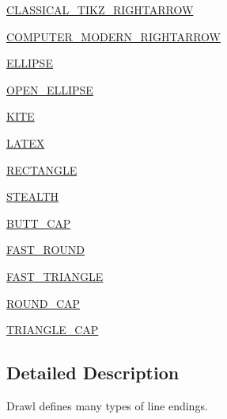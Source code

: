 \begin{DoxyCompactItemize}
\item 
\hyperlink{enumcom_1_1aarrelaakso_1_1drawl_1_1_line_ending_1_1_type_a2ad7fc532e223e6160cc8ac18aea591c}{C\+L\+A\+S\+S\+I\+C\+A\+L\+\_\+\+T\+I\+K\+Z\+\_\+\+R\+I\+G\+H\+T\+A\+R\+R\+OW}
\item 
\hyperlink{enumcom_1_1aarrelaakso_1_1drawl_1_1_line_ending_1_1_type_ad62a65c0f5a67f55d55bb27e5b4d6d10}{C\+O\+M\+P\+U\+T\+E\+R\+\_\+\+M\+O\+D\+E\+R\+N\+\_\+\+R\+I\+G\+H\+T\+A\+R\+R\+OW}
\item 
\hyperlink{enumcom_1_1aarrelaakso_1_1drawl_1_1_line_ending_1_1_type_a8e62fdb30e281b4d639d729ce0134a0d}{E\+L\+L\+I\+P\+SE}
\item 
\hyperlink{enumcom_1_1aarrelaakso_1_1drawl_1_1_line_ending_1_1_type_ac2a4c476b50f85245602abdbfe1bf8a7}{O\+P\+E\+N\+\_\+\+E\+L\+L\+I\+P\+SE}
\item 
\hyperlink{enumcom_1_1aarrelaakso_1_1drawl_1_1_line_ending_1_1_type_a8154683c83e45ef8147726f2f3845fc8}{K\+I\+TE}
\item 
\hyperlink{enumcom_1_1aarrelaakso_1_1drawl_1_1_line_ending_1_1_type_a58c18082a756b4d126cd08a01ede6bef}{L\+A\+T\+EX}
\item 
\hyperlink{enumcom_1_1aarrelaakso_1_1drawl_1_1_line_ending_1_1_type_a6428f3ac47109c9dbe046dddda0e25b3}{R\+E\+C\+T\+A\+N\+G\+LE}
\item 
\hyperlink{enumcom_1_1aarrelaakso_1_1drawl_1_1_line_ending_1_1_type_a36723b935663bf0b801d6e525d0625a9}{S\+T\+E\+A\+L\+TH}
\item 
\hyperlink{enumcom_1_1aarrelaakso_1_1drawl_1_1_line_ending_1_1_type_a48e7e5ca4218f75225d453077cc5fb96}{B\+U\+T\+T\+\_\+\+C\+AP}
\item 
\hyperlink{enumcom_1_1aarrelaakso_1_1drawl_1_1_line_ending_1_1_type_a8666b75fa6d9cbd89c55c1931002d01e}{F\+A\+S\+T\+\_\+\+R\+O\+U\+ND}
\item 
\hyperlink{enumcom_1_1aarrelaakso_1_1drawl_1_1_line_ending_1_1_type_a280550505a48050e5b05282b51460e25}{F\+A\+S\+T\+\_\+\+T\+R\+I\+A\+N\+G\+LE}
\item 
\hyperlink{enumcom_1_1aarrelaakso_1_1drawl_1_1_line_ending_1_1_type_a811892a581ba487630b2860401a7d078}{R\+O\+U\+N\+D\+\_\+\+C\+AP}
\item 
\hyperlink{enumcom_1_1aarrelaakso_1_1drawl_1_1_line_ending_1_1_type_ae14c36781bb0be94cc274ab7e258fa9c}{T\+R\+I\+A\+N\+G\+L\+E\+\_\+\+C\+AP}
\end{DoxyCompactItemize}


\subsection{Detailed Description}
Drawl defines many types of line endings. 

